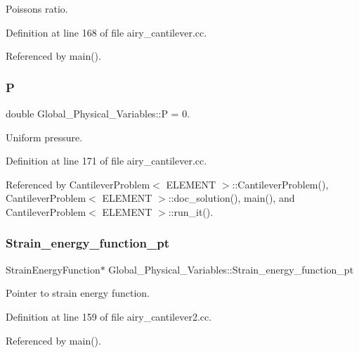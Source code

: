 Poisson\textquotesingle{}s ratio. 



Definition at line 168 of file airy\+\_\+cantilever.\+cc.



Referenced by main().

\mbox{\label{namespaceGlobal__Physical__Variables_a23c2ade6398f54040b869f7f3a2bcc4b}} 
\subsubsection{\texorpdfstring{P}{P}}
{\footnotesize\ttfamily double Global\+\_\+\+Physical\+\_\+\+Variables\+::P = 0.}



Uniform pressure. 



Definition at line 171 of file airy\+\_\+cantilever.\+cc.



Referenced by Cantilever\+Problem$<$ E\+L\+E\+M\+E\+N\+T $>$\+::\+Cantilever\+Problem(), Cantilever\+Problem$<$ E\+L\+E\+M\+E\+N\+T $>$\+::doc\+\_\+solution(), main(), and Cantilever\+Problem$<$ E\+L\+E\+M\+E\+N\+T $>$\+::run\+\_\+it().

\mbox{\label{namespaceGlobal__Physical__Variables_a73135f793690b4386bf83bbefc7bf310}} 
\subsubsection{\texorpdfstring{Strain\+\_\+energy\+\_\+function\+\_\+pt}{Strain\_energy\_function\_pt}}
{\footnotesize\ttfamily Strain\+Energy\+Function$\ast$ Global\+\_\+\+Physical\+\_\+\+Variables\+::\+Strain\+\_\+energy\+\_\+function\+\_\+pt}



Pointer to strain energy function. 



Definition at line 159 of file airy\+\_\+cantilever2.\+cc.



Referenced by main().

